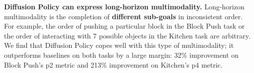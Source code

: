 



\textbf{Diffusion Policy can express long-horizon multimodality.}
Long-horizon multimodality is the completion of \textbf{different sub-goals} in inconsistent order. For example, the order of pushing a particular block in the Block Push task or the order of interacting with 7 possible objects in the Kitchen task are arbitrary.
%
We find that Diffusion Policy copes well with this type of multimodality; it outperforms baselines on both tasks by a large margin: 32\% improvement on Block Push's p2 metric and 213\% improvement on Kitchen's p4 metric.

